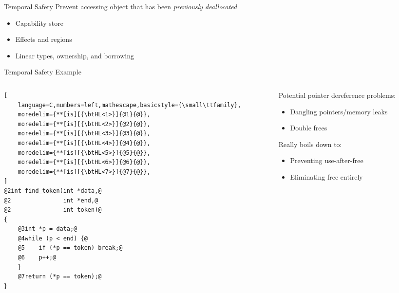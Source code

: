 \documentclass[aspectratio=169]{beamer}
\begin{document}
\begin{frame}[fragile]{Temporal Safety}
Prevent accessing object that has been \emph{previously deallocated}
\\
\pause

\begin{itemize}
   \item Capability store
   \item Effects and regions
   \item Linear types, ownership, and borrowing
\end{itemize}
\end{frame}

\begin{frame}[fragile]{Temporal Safety Example}
\begin{columns}[T]
\begin{column}{0.52\textwidth}
\begin{lstlisting}[
    language=C,numbers=left,mathescape,basicstyle={\small\ttfamily},
    moredelim={**[is][{\btHL<1>}]{@1}{@}},
    moredelim={**[is][{\btHL<2>}]{@2}{@}},
    moredelim={**[is][{\btHL<3>}]{@3}{@}},
    moredelim={**[is][{\btHL<4>}]{@4}{@}},
    moredelim={**[is][{\btHL<5>}]{@5}{@}},
    moredelim={**[is][{\btHL<6>}]{@6}{@}},
    moredelim={**[is][{\btHL<7>}]{@7}{@}},
]
@2int find_token(int *data,@
@2               int *end,@
@2               int token)@
{
    @3int *p = data;@
    @4while (p < end) {@
    @5    if (*p == token) break;@
    @6    p++;@
    }
    @7return (*p == token);@
}
\end{lstlisting}
\end{column} 
\begin{column}{0.44\textwidth}

\footnotesize{
\pause
Potential pointer dereference problems:
  \begin{itemize}
      \item Dangling pointers/memory leaks
      \item Double frees
  \end{itemize}
\pause
Really boils down to:
\begin{itemize}
    \item Preventing use-after-free
    \item Eliminating free entirely 
\end{itemize}
}
\end{column}
\end{columns}

\end{frame}
\end{document}
